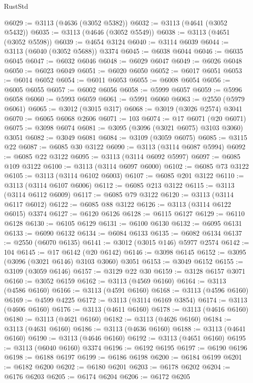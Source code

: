 \begin{lexlean}{RustStd}
\begin{coremodule}
{\begin{coremodule}
{{{{{{{{{{{{{{{{{{{{{{{{{{{{{{{{@6029 := @3113 (@4636 (@3052 @5382))
@6032 := @3113 (@4641 (@3052 @5432))
@6035 := @3113 (@4646 (@3052 @5549))
@6038 := @3113 (@4651 (@3052 @5598))
@6039 := @4654 @3124
@6040 := @3114 @6039
@6044 := @3113 (@6040 (@3052 @5688)) @3374
@6045 := @6038 @6044
@6046 := @6035 @6045
@6047 := @6032 @6046
@6048 := @6029 @6047
@6049 := @6026 @6048
@6050 := @6023 @6049
@6051 := @6020 @6050
@6052 := @6017 @6051
@6053 := @6014 @6052
@6054 := @6011 @6053
@6055 := @6008 @6054
@6056 := @6005 @6055
@6057 := @6002 @6056
@6058 := @5999 @6057
@6059 := @5996 @6058
@6060 := @5993 @6059
@6061 := @5991 @6060
@6063 := @2550 (@5979 @6061)
@6065 := @3012 (@3015 @317)
@6068 := @3019 (@3026 @2574) @3041
@6070 := @6065 @6068 @2606
@6071 := 103
@6074 := @17 @6071 (@20 @6071)
@6075 := @3098 @6074
@6081 := @3095 (@3096 (@3021 @6075) @3103 @3060) @3051
@6082 := @3049 @6081
@6084 := @3109 (@3059 @6075)
@6085 := @3115 @22
@6087 := @6085 @30 @3122
@6090 := @3113 (@3114 @6087 @5994)
@6092 := @6085 @22 @3122
@6095 := @3113 (@3114 @6092 @5997)
@6097 := @6085 @109 @3122
@6100 := @3113 (@3114 @6097 @6000)
@6102 := @6085 @73 @3122
@6105 := @3113 (@3114 @6102 @6003)
@6107 := @6085 @201 @3122
@6110 := @3113 (@3114 @6107 @6006)
@6112 := @6085 @213 @3122
@6115 := @3113 (@3114 @6112 @6009)
@6117 := @6085 @79 @3122
@6120 := @3113 (@3114 @6117 @6012)
@6122 := @6085 @88 @3122
@6126 := @3113 (@3114 @6122 @6015) @3374
@6127 := @6120 @6126
@6128 := @6115 @6127
@6129 := @6110 @6128
@6130 := @6105 @6129
@6131 := @6100 @6130
@6132 := @6095 @6131
@6133 := @6090 @6132
@6134 := @6084 @6133
@6135 := @6082 @6134
@6137 := @2550 (@6070 @6135)
@6141 := @3012 (@3015 @146) @5977 @2574
@6142 := 104
@6145 := @17 @6142 (@20 @6142)
@6146 := @3098 @6145
@6152 := @3095 (@3096 (@3021 @6146) @3103 @3060) @3051
@6153 := @3049 @6152
@6155 := @3109 (@3059 @6146)
@6157 := @3129 @22 @30
@6159 := @3128 @6157 @3071
@6160 := @3052 @6159
@6162 := @3113 (@4569 @6160)
@6164 := @3113 (@4586 @6160)
@6166 := @3113 (@4591 @6160)
@6168 := @3113 (@4596 @6160)
@6169 := @4599 @4225
@6172 := @3113 (@3114 @6169 @3854)
@6174 := @3113 (@4606 @6160)
@6176 := @3113 (@4611 @6160)
@6178 := @3113 (@4616 @6160)
@6180 := @3113 (@4621 @6160)
@6182 := @3113 (@4626 @6160)
@6184 := @3113 (@4631 @6160)
@6186 := @3113 (@4636 @6160)
@6188 := @3113 (@4641 @6160)
@6190 := @3113 (@4646 @6160)
@6192 := @3113 (@4651 @6160)
@6195 := @3113 (@6040 @6160) @3374
@6196 := @6192 @6195
@6197 := @6190 @6196
@6198 := @6188 @6197
@6199 := @6186 @6198
@6200 := @6184 @6199
@6201 := @6182 @6200
@6202 := @6180 @6201
@6203 := @6178 @6202
@6204 := @6176 @6203
@6205 := @6174 @6204
@6206 := @6172 @6205
}}}}}}}}}}}}}}}}}}}}}}}}}}}}}}}}
\end{coremodule}}
\end{coremodule}
\end{lexlean}
